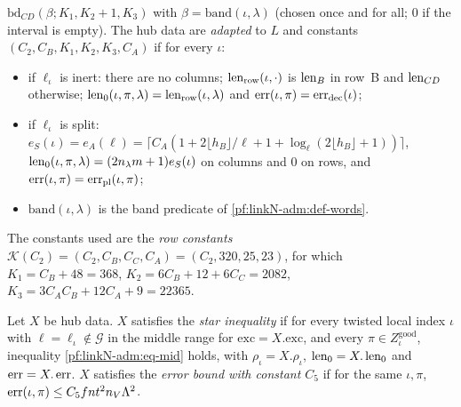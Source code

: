 \begin{definition}
$\mathrm{bd}_{CD}(\beta;K_1,K_2+1,K_3)$ with $\beta=\mathrm{band}(\iota,\lambda)$ (chosen once and for all; $0$ if the
interval is empty).
The hub data are \emph{adapted} to $L$ and constants $(C_2,C_B,K_1,K_2,K_3,C_A)$ if for every $\iota$:
\begin{itemize}
\item if $\ell_\iota$ is inert: there are no columns; $\operatorname{len}_{\mathrm{row}}(\iota,\cdot)$ is $\operatorname{len}_B$ in
  row~B and $\operatorname{len}_{CD}$ otherwise; $\operatorname{len}_0(\iota,\pi,\lambda)=\operatorname{len}_{\mathrm{row}}(\iota,\lambda)$
  and $\operatorname{err}(\iota,\pi)=\operatorname{err}_{\mathrm{dec}}(\iota)$;
\item if $\ell_\iota$ is split: $e_S(\iota)=e_A(\ell)=\lceil C_A(1+2\lfloor h_B\rfloor/\ell+1+\log_\ell(2\lfloor
  h_B\rfloor+1))\rceil$, $\operatorname{len}_0(\iota,\pi,\lambda)=(2n_\lambda m+1)e_S(\iota)$ on columns and $0$ on rows,
  and $\operatorname{err}(\iota,\pi)=\operatorname{err}_{\mathrm{pl}}(\iota,\pi)$;
\item $\mathrm{band}(\iota,\lambda)$ is the band predicate of \cref{pf:linkN-adm:def-words}.
\end{itemize}
The constants used are the \emph{row constants} $\mathcal K(C_2)=(C_2,C_B,C_C,C_A)=(C_2,320,25,23)$, for which
$K_1=C_B+48=368$, $K_2=6C_B+12+6C_C=2082$, $K_3=3C_AC_B+12C_A+9=22365$.
\end{definition}

\begin{definition}\label{pf:linkN-adm:def-star}
Let $X$ be hub data. $X$ satisfies the \emph{star inequality} if for every twisted local index $\iota$ with
$\ell=\ell_\iota\notin\mathcal G$ in the middle range for $\mathrm{exc}=X.\mathrm{exc}$, and every $\pi\in
Z^{\mathrm{good}}_\iota$, inequality \eqref{pf:linkN-adm:eq-mid} holds, with $\rho_\iota=X.\rho_\iota$,
$\operatorname{len}_0=X.\operatorname{len}_0$ and $\operatorname{err}=X.\operatorname{err}$. $X$ satisfies the \emph{error bound with constant
$C_5$} if for the same $\iota,\pi$, $\operatorname{err}(\iota,\pi)\le C_5fnt^2n_V\Lambda^2$.
\end{definition}

